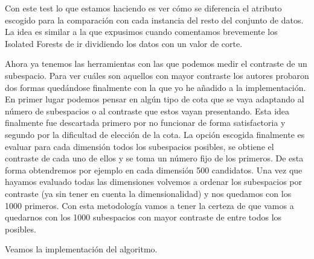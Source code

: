 Con este test lo que estamos haciendo es ver cómo se diferencia el atributo escogido para la comparación con cada instancia del resto del conjunto de datos. La idea es similar a la que expusimos cuando comentamos brevemente los Isolated Forests de ir dividiendo los datos con un valor de corte. 

Ahora ya tenemos las herramientas con las que podemos medir el contraste de un subespacio. Para ver cuáles son aquellos con mayor contraste los autores probaron dos formas quedándose finalmente con la que yo he añadido a la implementación. En primer lugar podemos pensar en algún tipo de cota que se vaya adaptando al número de subespacios o al contraste que estos vayan presentando. Esta idea finalmente fue descartada primero por no funcionar de forma satisfactoria y segundo por la dificultad de elección de la cota. La opción escogida finalmente es evaluar para cada dimensión todos los subespacios posibles, se obtiene el contraste de cada uno de ellos y se toma un número fijo de los primeros. De esta forma obtendremos por ejemplo en cada dimensión 500 candidatos. Una vez que hayamos evaluado todas las dimensiones volvemos a ordenar los subespacios por contraste (ya sin tener en cuenta la dimensionalidad) y nos quedamos con los 1000 primeros. Con esta metodología vamos a tener la certeza de que vamos a quedarnos con los 1000 subespacios con mayor contraste de entre todos los posibles. 

Veamos la implementación del algoritmo.

